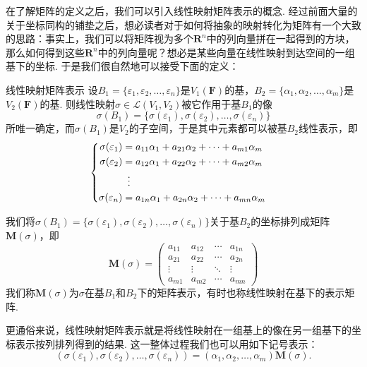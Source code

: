 在了解矩阵的定义之后，我们可以引入线性映射矩阵表示的概念. 经过前面大量的关于坐标同构的铺垫之后，想必读者对于如何将抽象的映射转化为矩阵有一个大致的思路：事实上，我们可以将矩阵视为多个$\mathbf{R}^n$中的列向量拼在一起得到的方块，那么如何得到这些$\mathbf{R}^n$中的列向量呢？想必是某些向量在线性映射到达空间的一组基下的坐标. 于是我们很自然地可以接受下面的定义：
\begin{definition}{}{线性映射矩阵表示}
    设$B_1=\{\varepsilon_1,\varepsilon_2,\ldots,\varepsilon_n\}$是$V_1(\mathbf{F})$的基，$B_2=\{\alpha_1,\alpha_2,\ldots,\alpha_m\}$是$V_2(\mathbf{F})$的基. 则线性映射$\sigma \in \mathcal{L}(V_1,V_2)$被它作用于基$B_1$的像
    \[\sigma(B_1)=\{\sigma(\varepsilon_1),\sigma(\varepsilon_2),\ldots,\sigma(\varepsilon_n)\}\]
    所唯一确定，而$\sigma(B_1)$是$V_2$的子空间，于是其中元素都可以被基$B_2$线性表示，即
    \[ \begin{cases} \begin{aligned}
                \sigma(\varepsilon_1) & = a_{11}\alpha_1+a_{21}\alpha_2+\cdots+a_{m1}\alpha_m \\
                \sigma(\varepsilon_2) & = a_{12}\alpha_1+a_{22}\alpha_2+\cdots+a_{m2}\alpha_m \\
                                      & \vdotswithin{=}                                       \\
                \sigma(\varepsilon_n) & = a_{1n}\alpha_1+a_{2n}\alpha_2+\cdots+a_{mn}\alpha_m
            \end{aligned} \end{cases} \]

    我们将$\sigma(B_1)=\{\sigma(\varepsilon_1),\sigma(\varepsilon_2),\ldots,\sigma(\varepsilon_n)\}$关于基$B_2$的坐标排列成矩阵$\mathbf{M}(\sigma)$，即
    \[\mathbf{M}(\sigma)=\begin{pmatrix}
            a_{11} & a_{12} & \cdots & a_{1n} \\
            a_{21} & a_{22} & \cdots & a_{2n} \\
            \vdots & \vdots & \ddots & \vdots \\
            a_{m1} & a_{m2} & \cdots & a_{mn}
        \end{pmatrix}\]
    我们称$\mathbf{M}(\sigma)$为$\sigma$在基$B_1$和$B_2$下的矩阵表示，有时也称线性映射在基下的表示矩阵.
\end{definition}

更通俗来说，线性映射矩阵表示就是将线性映射在一组基上的像在另一组基下的坐标表示按列排列得到的结果. 这一整体过程我们也可以用如下记号表示：
\begin{equation}\label{eq:7:线性映射矩阵表示}
    (\sigma(\varepsilon_1),\sigma(\varepsilon_2),\ldots,\sigma(\varepsilon_n))=(\alpha_1,\alpha_2,\ldots,\alpha_m)\mathbf{M}(\sigma).
\end{equation}

